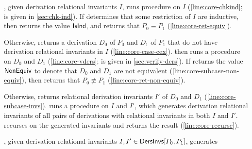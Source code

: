 \verifyaux, given derivation relational invariants $I$, runs procedure
\chkinductive on $I$ (\autoref{line:core-chkind}; 
%
\chkinductive is given in \autoref{sec:chk-ind}).
%
If \chkinductive determines that some restriction of $I$ are
inductive, then \chkinductive returns the value $\mathsf{IsInd}$, and
\verifyaux returns that $P_0 \equiv P_1$
(\autoref{line:core-ret-equiv}).

Otherwise, \chkinductive returns a derivation $D_0$ of $P_0$ and $D_1$
of $P_1$ that do not have derivation relational
invariants in $I$ (\autoref{line:core-case-cex}).
%
\verifyaux then runs a procedure \verifyders on $D_0$ and $D_1$
(\autoref{line:core-vders}; \verifyders is given in
\autoref{sec:verify-ders}).
%
If \verifyders returns the value $\mathsf{NonEquiv}$ to denote that $D_0$ and
$D_1$ are not equivalent (\autoref{line:core-subcase-non-equiv}), then
\verifyaux returns that $P_0 \not\equiv P_1$
(\autoref{line:core-ret-non-equiv}).

Otherwise, \verifyders returns relational derivation invariants $I'$
of $D_0$ and $D_1$ (\autoref{line:core-subcase-invs}).
%
\verifyaux runs a procedure \mergeinvs on $I$ and $I'$, which
generates derivation relational invariants of all pairs of derivations
with relational invariants in both $I$ and $I'$.
%
\verifyaux recurses on the generated invariants and returns the result
(\autoref{line:core-recurse}).

\mergeinvs, given derivation relational invariants $I, I' \in
\mathsf{DersInvs}[ P_0, P_1 ]$, generates 
%

